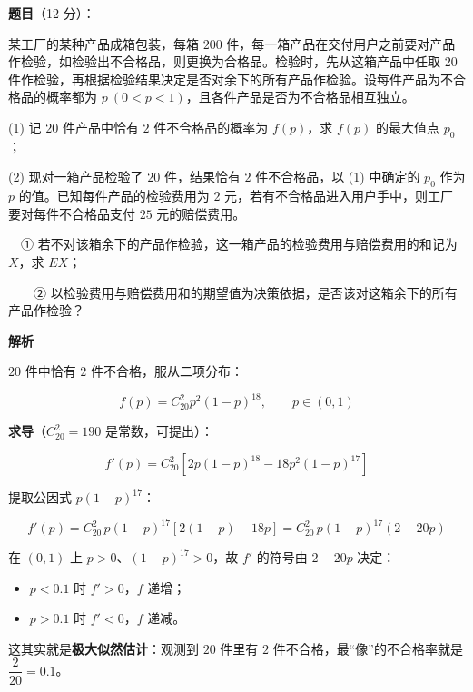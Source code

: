 \begin{answer}

\textbf{题目}（12 分）：

某工厂的某种产品成箱包装，每箱 $200$ 件，每一箱产品在交付用户之前要对产品作检验，如检验出不合格品，则更换为合格品。检验时，先从这箱产品中任取 $20$ 件作检验，再根据检验结果决定是否对余下的所有产品作检验。设每件产品为不合格品的概率都为 $p\ (0<p<1)$，且各件产品是否为不合格品相互独立。

  (1) 记 $20$ 件产品中恰有 $2$ 件不合格品的概率为 $f(p)$，求 $f(p)$ 的最大值点 $p_0$；

  (2) 现对一箱产品检验了 $20$ 件，结果恰有 $2$ 件不合格品，以 (1) 中确定的 $p_0$ 作为 $p$ 的值。已知每件产品的检验费用为 $2$ 元，若有不合格品进入用户手中，则工厂要对每件不合格品支付 $25$ 元的赔偿费用。

  　① 若不对该箱余下的产品作检验，这一箱产品的检验费用与赔偿费用的和记为 $X$，求 $EX$；

  　　② 以检验费用与赔偿费用和的期望值为决策依据，是否该对这箱余下的所有产品作检验？

\par\medskip

\Needspace{0.4\textheight}

\textbf{解析}


$20$ 件中恰有 $2$ 件不合格，服从二项分布：

\nopagebreak[4]
\[f(p)=C_{20}^{2}p^{2}(1-p)^{18},\qquad p\in(0,1)\]

\textbf{求导}（$C_{20}^{2}=190$ 是常数，可提出）：

\nopagebreak[4]
\[f'(p)=C_{20}^{2}\left[2p(1-p)^{18}-18p^{2}(1-p)^{17}\right]\]

提取公因式 $p(1-p)^{17}$：

\nopagebreak[4]
\[f'(p)=C_{20}^{2}\,p(1-p)^{17}\left[2(1-p)-18p\right]=C_{20}^{2}\,p(1-p)^{17}(2-20p)\]

在 $(0,1)$ 上 $p>0$、$(1-p)^{17}>0$，故 $f'$ 的符号由 $2-20p$ 决定：

\begin{itemize}
\item $p<0.1$ 时 $f'>0$，$f$ 递增；
\item $p>0.1$ 时 $f'<0$，$f$ 递减。
\end{itemize}

\begin{gktip}
这其实就是\textbf{极大似然估计}：观测到 $20$ 件里有 $2$ 件不合格，最“像”的不合格率就是 $\dfrac2{20}=0.1$。
\end{gktip}


\end{answer}

